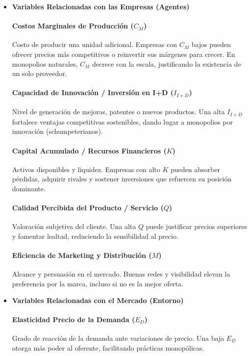 \documentclass[a4paper,12pt]{article}
\begin{document}
\begin{itemize}
    \item \textbf{Variables Relacionadas con las Empresas (Agentes)}

    \paragraph{Costos Marginales de Producción ($C_M$)} Costo de producir una unidad adicional. Empresas con $C_M$ bajos pueden ofrecer precios más competitivos o reinvertir sus márgenes para crecer. En monopolios naturales, $C_M$ decrece con la escala, justificando la existencia de un solo proveedor.

    \paragraph{Capacidad de Innovación / Inversión en I+D ($I_{I+D}$)} Nivel de generación de mejoras, patentes o nuevos productos. Una alta $I_{I+D}$ fortalece ventajas competitivas sostenibles, dando lugar a monopolios por innovación (schumpeterianos).

    \paragraph{Capital Acumulado / Recursos Financieros ($K$)} Activos disponibles y liquidez. Empresas con alto $K$ pueden absorber pérdidas, adquirir rivales y sostener inversiones que refuercen su posición dominante.

    \paragraph{Calidad Percibida del Producto / Servicio ($Q$)} Valoración subjetiva del cliente. Una alta $Q$ puede justificar precios superiores y fomentar lealtad, reduciendo la sensibilidad al precio.

    \paragraph{Eficiencia de Marketing y Distribución ($M$)} Alcance y persuasión en el mercado. Buenas redes y visibilidad elevan la preferencia por la marca, incluso si no es la mejor oferta.

    \item \textbf{Variables Relacionadas con el Mercado (Entorno)}

    \paragraph{Elasticidad Precio de la Demanda ($E_D$)} Grado de reacción de la demanda ante variaciones de precio. Una baja $E_D$ otorga más poder al oferente, facilitando prácticas monopólicas.


\end{itemize}
\end{document}
